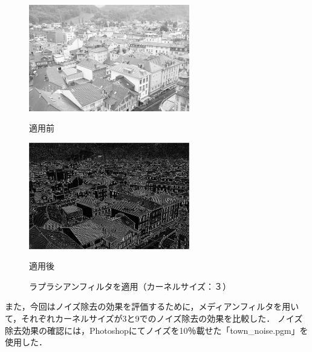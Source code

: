 \documentclass{jsarticle}
\begin{document}
\begin{figure}[htbp]
 \begin{minipage}{0.5\hsize}
  \begin{center}
   \includegraphics[width=70mm]{town.png}
  \end{center}
  \caption{適用前}
  \label{fig:one}
 \end{minipage}
 \begin{minipage}{0.5\hsize}
  \begin{center}
   \includegraphics[width=70mm]{output_laplacian.png}
  \end{center}
  \caption{適用後}
  \label{fig:two}
 \end{minipage}
 \caption{ラプラシアンフィルタを適用（カーネルサイズ：３）}
\end{figure}

\newpage

また，今回はノイズ除去の効果を評価するために，メディアンフィルタを用いて，それぞれカーネルサイズが3と9でのノイズ除去の効果を比較した．
ノイズ除去効果の確認には，Photoshopにてノイズを10％載せた「town\_noise.pgm」を使用した．
\end{document}
